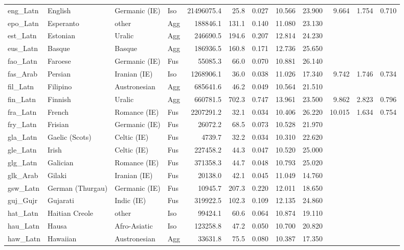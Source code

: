 \begin{tabular}{ll l l rr rr r rr r}
eng\_Latn & English & Germanic (IE) & Iso & 21496075.4 & 25.8 & 0.027 & 10.566 & 23.900 & 9.664 & 1.754 & 0.710 \\
epo\_Latn & Esperanto & other & Agg & 188846.1 & 131.1 & 0.140 & 11.080 & 23.130 &  &  &  \\
est\_Latn & Estonian & Uralic & Agg & 246690.5 & 194.6 & 0.207 & 12.814 & 24.230 &  &  &  \\
eus\_Latn & Basque & Basque & Agg & 186936.5 & 160.8 & 0.171 & 12.736 & 25.650 &  &  &  \\
fao\_Latn & Faroese & Germanic (IE) & Fus & 55085.3 & 66.0 & 0.070 & 10.881 & 26.140 &  &  &  \\
fas\_Arab & Persian & Iranian (IE) & Iso & 1268906.1 & 36.0 & 0.038 & 11.026 & 17.340 & 9.742 & 1.746 & 0.734 \\
fil\_Latn & Filipino & Austronesian & Agg & 685641.6 & 46.2 & 0.049 & 10.564 & 21.510 &  &  &  \\
fin\_Latn & Finnish & Uralic & Agg & 660781.5 & 702.3 & 0.747 & 13.961 & 23.500 & 9.862 & 2.823 & 0.796 \\
fra\_Latn & French & Romance (IE) & Fus & 2207291.2 & 32.1 & 0.034 & 10.406 & 26.220 & 10.015 & 1.634 & 0.754 \\
fry\_Latn & Frisian & Germanic (IE) & Fus & 26072.2 & 68.5 & 0.073 & 10.528 & 21.970 &  &  &  \\
gla\_Latn & Gaelic (Scots) & Celtic (IE) & Fus & 4739.7 & 32.2 & 0.034 & 10.310 & 22.620 &  &  &  \\
gle\_Latn & Irish & Celtic (IE) & Fus & 227458.2 & 44.3 & 0.047 & 10.520 & 25.000 &  &  &  \\
glg\_Latn & Galician & Romance (IE) & Fus & 371358.3 & 44.7 & 0.048 & 10.793 & 25.020 &  &  &  \\
glk\_Arab & Gilaki & Iranian (IE) & Fus & 20138.0 & 42.1 & 0.045 & 11.049 & 14.760 &  &  &  \\
gsw\_Latn & German (Thurgau) & Germanic (IE) & Fus & 10945.7 & 207.3 & 0.220 & 12.011 & 18.650 &  &  &  \\
guj\_Gujr & Gujarati & Indic (IE) & Fus & 319922.5 & 102.3 & 0.109 & 12.135 & 24.860 &  &  &  \\
hat\_Latn & Haitian Creole & other & Iso & 99424.1 & 60.6 & 0.064 & 10.874 & 19.110 &  &  &  \\
hau\_Latn & Hausa & Afro-Asiatic & Iso & 123258.8 & 47.2 & 0.050 & 10.700 & 20.820 &  &  &  \\
haw\_Latn & Hawaiian & Austronesian & Agg & 33631.8 & 75.5 & 0.080 & 10.387 & 17.350 &  &  &  \\

\end{tabular}
